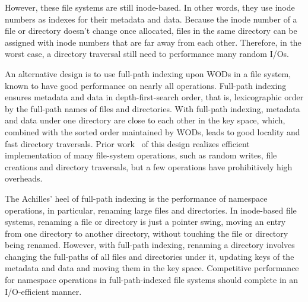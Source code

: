 However, these file systems are still inode-based.
In other words, they use inode numbers as indexes for their metadata and data.
Because the inode number of a file or directory doesn't change once allocated,
files in the same directory can be assigned with inode numbers that
are far away from each other.
Therefore, in the worst case, a directory traversal still need to performance
many random I/Os.

An alternative design is to use full-path indexing upon WODs in a file system,
known to have good performance on nearly all operations.
Full-path indexing ensures metadata and data in depth-first-search order,
that is, lexicographic order by the full-path names of files and directories.
With full-path indexing, metadata and data under one directory are close to each
other in the key space, which, combined with the sorted order maintained by
WODs, leads to good locality and fast directory traversals.
Prior work~\citep{betrfs1,betrfs1tos,betrfs2,betrfs2tos,betrfs3} of this design
realizes efficient implementation of many file-system operations, such as random
writes, file creations and directory traversals,
but a few operations have prohibitively high overheads.

The Achilles' heel of full-path indexing is the performance of namespace
operations, in particular, renaming large files and directories.
In inode-based file systems,
renaming a file or directory is just a pointer swing,
moving an entry from one directory to another directory,
without touching the file or directory being renamed.
However, with full-path indexing, renaming a directory involves changing the
full-paths of all files and directories under it,
updating keys of the metadata and data and moving them in the key space.
Competitive performance for namespace operations in full-path-indexed file
systems should complete in an I/O-efficient manner.

